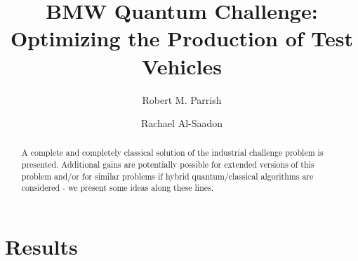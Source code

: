 \documentclass[aps,prl,twocolumn,superscriptaddress,groupedaddress]{revtex4}  %
\begin{document}

\title{
BMW Quantum Challenge: Optimizing the Production of Test Vehicles
}

\author{Robert M. Parrish}
\author{Rachael Al-Saadon}


\begin{abstract} 
A complete and completely classical solution of the industrial challenge problem
is presented.  Additional gains are potentially possible for extended versions
of this problem and/or for similar problems if hybrid quantum/classical
algorithms are considered - we present some ideas along these lines.

\end{abstract}

\maketitle

\section{Results}
\end{document}
